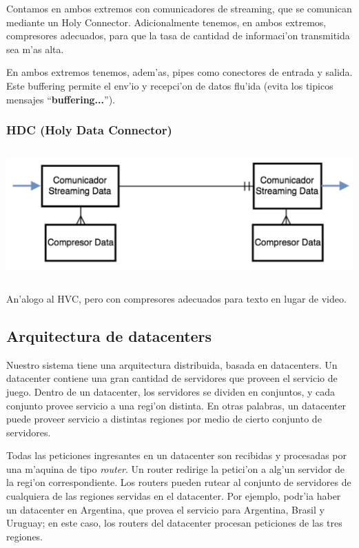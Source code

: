 Contamos en ambos extremos con comunicadores de streaming, que se comunican mediante un Holy Connector. Adicionalmente tenemos, en ambos extremos, compresores adecuados, para que la tasa de cantidad de informaci'on transmitida sea m'as alta.

En ambos extremos tenemos, adem'as, pipes como conectores de entrada y salida. Este buffering permite el env'io y recepci'on de datos flu'ida (evita los tipicos mensajes ``\textbf{buffering...}'').


\subsubsection{HDC (Holy Data Connector)}

\includegraphics[height=5cm]{diagramas/HDC} 

An'alogo al HVC, pero con compresores adecuados para texto en lugar de video. 

\subsection{Arquitectura de datacenters}

Nuestro sistema tiene una arquitectura distribuida, basada en datacenters. Un datacenter contiene una gran cantidad de servidores que proveen el servicio de juego. Dentro de un datacenter, los servidores se dividen en conjuntos, y cada conjunto provee servicio a una regi'on distinta. En otras palabras, un datacenter puede proveer servicio a distintas regiones por medio de cierto conjunto de servidores.

Todas las peticiones ingresantes en un datacenter son recibidas y procesadas por una m'aquina de tipo \textit{router}. Un router redirige la petici'on a alg'un servidor de la regi'on correspondiente. Los routers pueden rutear al conjunto de servidores de cualquiera de las regiones servidas en el datacenter. Por ejemplo, podr'ia haber un datacenter en Argentina, que provea el servicio para Argentina, Brasil y Uruguay; en este caso, los routers del datacenter procesan peticiones de las tres regiones.

